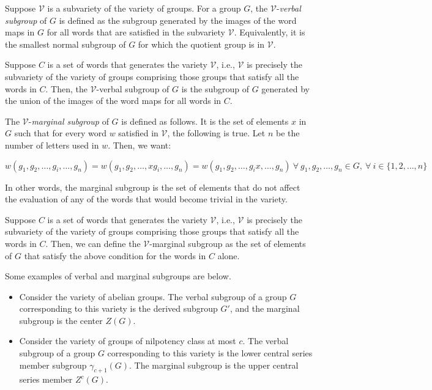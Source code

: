 Suppose $\mathcal{V}$ is a subvariety of the variety of groups. For a
group $G$, the $\mathcal{V}$-{\em verbal subgroup} of $G$ is defined
as the subgroup generated by the images of the word maps in $G$ for
all words that are satisfied in the subvariety
$\mathcal{V}$. Equivalently, it is the smallest normal subgroup of $G$
for which the quotient group is in $\mathcal{V}$.

Suppose $C$ is a set of words that generates the variety
$\mathcal{V}$, i.e., $\mathcal{V}$ is precisely the subvariety of the
variety of groups comprising those groups that satisfy all the words
in $C$. Then, the $\mathcal{V}$-verbal subgroup of $G$ is the subgroup
of $G$ generated by the union of the images of the word maps for all
words in $C$.

The $\mathcal{V}$-{\em marginal subgroup} of $G$ is defined as
follows. It is the set of elements $x$ in $G$ such that for every word
$w$ satisfied in $\mathcal{V}$, the following is true. Let $n$ be the number of letters used in $w$. Then, we want:

\begin{small}
$$w(g_1,g_2,\dots,g_i, \dots,g_n) = w(g_1,g_2,\dots,xg_i,\dots,g_n) = w(g_1,g_2,\dots,g_ix,\dots,g_n) \ \forall \ g_1,g_2,\dots,g_n \in G, \ \forall \ i \in \{ 1,2,\dots,n\}$$
\end{small}

In other words, the marginal subgroup is the set of elements that do not
affect the evaluation of any of the words that would become trivial in
the variety.

Suppose $C$ is a set of words that generates the variety
$\mathcal{V}$, i.e., $\mathcal{V}$ is precisely the subvariety of the
variety of groups comprising those groups that satisfy all the words
in $C$. Then, we can define the $\mathcal{V}$-marginal subgroup as the
set of elements of $G$ that satisfy the above condition for the words
in $C$ alone.

Some examples of verbal and marginal subgroups are below.

\begin{itemize}
\item Consider the variety of abelian groups. The verbal subgroup of a
  group $G$ corresponding to this variety is the derived subgroup
  $G'$, and the marginal subgroup is the center $Z(G)$.
\item Consider the variety of groups of nilpotency class at most
  $c$. The verbal subgroup of a group $G$ corresponding to this
  variety is the lower central series member subgroup
  $\gamma_{c+1}(G)$. The marginal subgroup is the upper central series
  member $Z^c(G)$.
\end{itemize}


